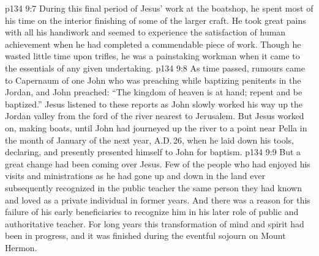 \vs p134 9:7 During this final period of Jesus’ work at the boatshop, he spent most of his time on the interior finishing of some of the larger craft. He took great pains with all his handiwork and seemed to experience the satisfaction of human achievement when he had completed a commendable piece of work. Though he wasted little time upon trifles, he was a painstaking workman when it came to the essentials of any given undertaking.
\vs p134 9:8 \pc As time passed, rumours came to Capernaum of one John who was preaching while baptizing penitents in the Jordan, and John preached: “The kingdom of heaven is at hand; repent and be baptized.” Jesus listened to these reports as John slowly worked his way up the Jordan valley from the ford of the river nearest to Jerusalem. But Jesus worked on, making boats, until John had journeyed up the river to a point near Pella in the month of January of the next year, A.D.\,26, when he laid down his tools, declaring,  and presently presented himself to John for baptism.
\vs p134 9:9 But a great change had been coming over Jesus. Few of the people who had enjoyed his visits and ministrations as he had gone up and down in the land ever subsequently recognized in the public teacher the same person they had known and loved as a private individual in former years. And there was a reason for this failure of his early beneficiaries to recognize him in his later role of public and authoritative teacher. For long years this transformation of mind and spirit had been in progress, and it was finished during the eventful sojourn on Mount Hermon.
